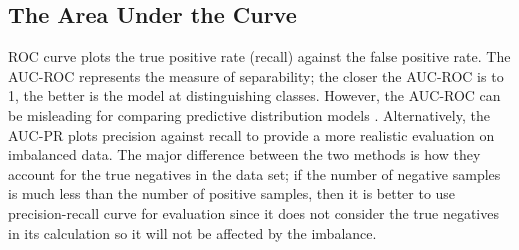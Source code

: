 \subsection{The Area Under the Curve}

\ac{ROC} curve plots the true positive rate (recall) against the false positive rate. The \ac{AUC-ROC} represents the measure of separability; the closer the AUC-ROC is to 1, the better is the model at distinguishing classes. However, the AUC-ROC can be misleading for comparing predictive distribution models \cite{lobo_auc:_2008}.
Alternatively, the \ac{AUC-PR} plots precision against recall to provide a more realistic evaluation on imbalanced data. The major difference between the two methods is how they account for the true negatives in the data set; if the number of negative samples is much less than the number of positive samples, then it is better to use precision-recall curve for evaluation since it does not consider the true negatives in its calculation so it will not be affected by the imbalance.
